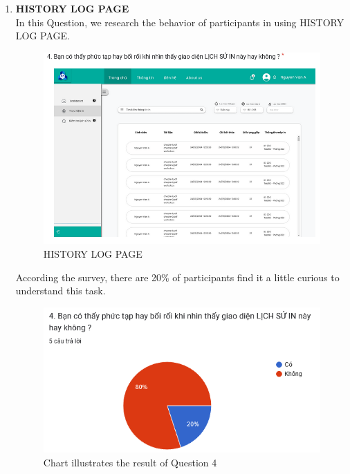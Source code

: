 \documentclass[a4paper]{report}
\begin{document}
\begin{enumerate}
    \item \textbf{HISTORY LOG PAGE} \\
    In this Question, we research the behavior of participants in using HISTORY LOG PAGE.
\begin{figure}[!h]
    \centering
    \includegraphics[width=0.8\linewidth]{images/image_uasbility/Q4_SPSO.png}
    \caption{HISTORY LOG PAGE}
    \label{fig:HISTORY LOG PAGE}
\end{figure}
\newpage
According the survey, there are 20\% of participants find it a little curious to understand this task.
\begin{figure}[!h]
    \centering
    \includegraphics[width=0.8\linewidth]{images/image_uasbility/A4_SPSO.png}
    \caption{Chart illustrates the result of Question 4}
    \label{fig:Chart illustrates the result of Question 4}
\end{figure}
\end{enumerate}
\end{document}
